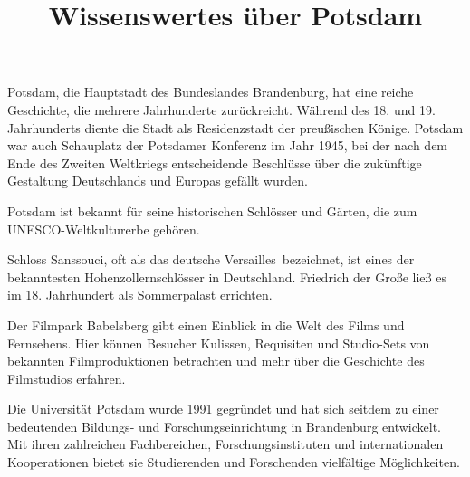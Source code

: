 \documentclass[a4paper]{article}
\title{Wissenswertes über Potsdam}
\date{}
\begin{document}
\maketitle

Potsdam, die Hauptstadt des Bundeslandes Brandenburg, hat eine reiche Geschichte, die mehrere Jahrhunderte zurückreicht. Während des 18. und 19. Jahrhunderts diente die Stadt als Residenzstadt der preußischen Könige. Potsdam war auch Schauplatz der Potsdamer Konferenz im Jahr 1945, bei der nach dem Ende des Zweiten Weltkriegs entscheidende Beschlüsse über die zukünftige Gestaltung Deutschlands und Europas gefällt wurden.

Potsdam ist bekannt für seine historischen Schlösser und Gärten, die zum UNESCO-Weltkulturerbe gehören.

Schloss Sanssouci, oft als das \glqq deutsche Versailles\grqq\ bezeichnet, ist eines der bekanntesten Hohenzollernschlösser in Deutschland. Friedrich der Große ließ es im 18. Jahrhundert als Sommerpalast errichten.

Der Filmpark Babelsberg gibt einen Einblick in die Welt des Films und Fernsehens. Hier können Besucher Kulissen, Requisiten und Studio-Sets von bekannten Filmproduktionen betrachten und mehr über die Geschichte des Filmstudios erfahren.

Die Universität Potsdam wurde 1991 gegründet und hat sich seitdem zu einer bedeutenden Bildungs- und Forschungseinrichtung in Brandenburg entwickelt. Mit ihren zahlreichen Fachbereichen, Forschungsinstituten und internationalen Kooperationen bietet sie Studierenden und Forschenden vielfältige Möglichkeiten.
\end{document}
